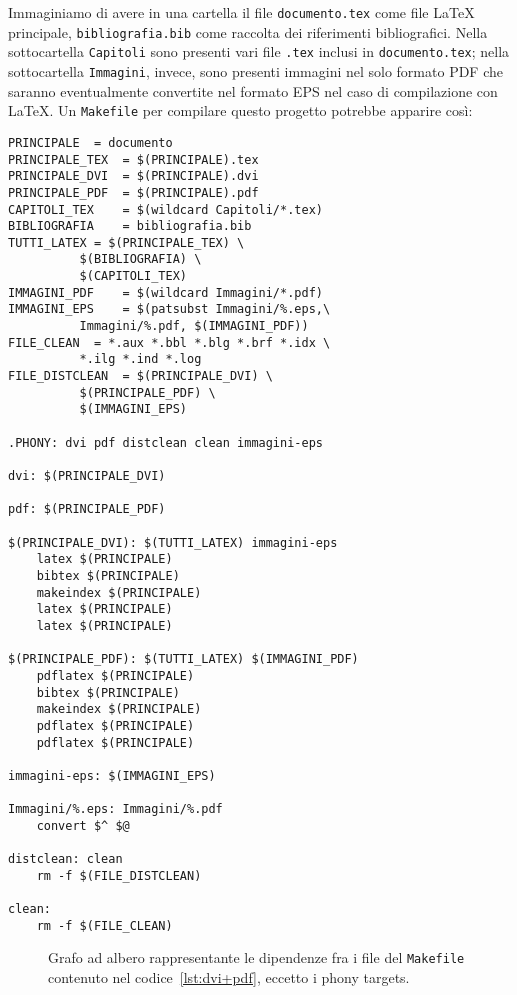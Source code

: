 Immaginiamo di avere in una cartella il file \texttt{documento.tex} come file
\LaTeX{}
principale, \texttt{bibliografia.bib} come raccolta dei riferimenti
bibliografici.  Nella sottocartella \texttt{Capitoli} sono presenti vari file
\texttt{.tex} inclusi in \texttt{documento.tex}; nella sottocartella
\texttt{Immagini}, invece, sono presenti immagini nel solo formato \textsc{PDF}
che saranno eventualmente convertite nel formato \textsc{EPS} nel caso di
compilazione con \LaTeX.  Un \texttt{Makefile} per compilare questo progetto
potrebbe apparire così:
\begin{lstlisting}[caption={\texttt{Makefile} in cui la prima regola compila il
documento in \textsc{DVI} convertendo le immagini \textsc{PDF} in \textsc{EPS},
la seconda regola compila in formato \textsc{PDF}.},
label=lst:dvi+pdf]
PRINCIPALE 	= documento
PRINCIPALE_TEX	= $(PRINCIPALE).tex
PRINCIPALE_DVI	= $(PRINCIPALE).dvi
PRINCIPALE_PDF	= $(PRINCIPALE).pdf
CAPITOLI_TEX	= $(wildcard Capitoli/*.tex)
BIBLIOGRAFIA	= bibliografia.bib
TUTTI_LATEX	= $(PRINCIPALE_TEX) \
		  $(BIBLIOGRAFIA) \
		  $(CAPITOLI_TEX)
IMMAGINI_PDF	= $(wildcard Immagini/*.pdf)
IMMAGINI_EPS	= $(patsubst Immagini/%.eps,\
		  Immagini/%.pdf, $(IMMAGINI_PDF))
FILE_CLEAN	= *.aux *.bbl *.blg *.brf *.idx \
		  *.ilg *.ind *.log
FILE_DISTCLEAN	= $(PRINCIPALE_DVI) \
		  $(PRINCIPALE_PDF) \
		  $(IMMAGINI_EPS)

.PHONY: dvi pdf distclean clean immagini-eps

dvi: $(PRINCIPALE_DVI)

pdf: $(PRINCIPALE_PDF)

$(PRINCIPALE_DVI): $(TUTTI_LATEX) immagini-eps
	latex $(PRINCIPALE)
	bibtex $(PRINCIPALE)
	makeindex $(PRINCIPALE)
	latex $(PRINCIPALE)
	latex $(PRINCIPALE)

$(PRINCIPALE_PDF): $(TUTTI_LATEX) $(IMMAGINI_PDF)
	pdflatex $(PRINCIPALE)
	bibtex $(PRINCIPALE)
	makeindex $(PRINCIPALE)
	pdflatex $(PRINCIPALE)
	pdflatex $(PRINCIPALE)

immagini-eps: $(IMMAGINI_EPS)

Immagini/%.eps: Immagini/%.pdf
	convert $^ $@

distclean: clean
	rm -f $(FILE_DISTCLEAN)

clean:
	rm -f $(FILE_CLEAN)
\end{lstlisting}
\begin{figure}
  \centering
  \caption{Grafo ad albero rappresentante le dipendenze fra i file del
    \texttt{Makefile} contenuto nel codice~\ref{lst:dvi+pdf}, eccetto i phony
    targets.}
  \label{fig:grafo-albero2}
\end{figure}
